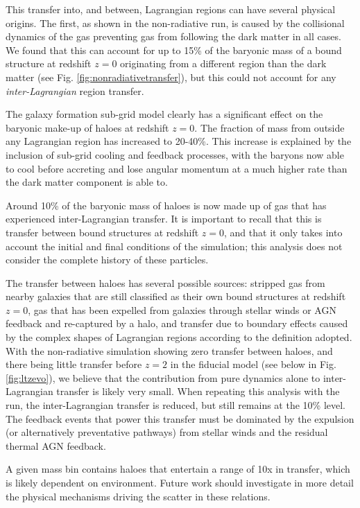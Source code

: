 This transfer into, and between, Lagrangian regions can have several physical
origins. The first, as shown in the non-radiative run, is caused by the
collisional dynamics of the gas preventing gas from following the dark matter
in all cases. We found that this can account for up to 15\% of the baryonic
mass of a bound structure at redshift $z=0$ originating from a different
region than the dark matter (see Fig. \ref{fig:nonradiativetransfer}), but this
could not account for any \emph{inter-Lagrangian} region transfer.

The galaxy formation sub-grid model clearly has a significant effect on the
baryonic make-up of haloes at redshift $z=0$. The fraction of mass from
outside any Lagrangian region has increased to 20-40\%. This increase is
explained by the inclusion of sub-grid cooling and feedback processes, with
the baryons now able to cool before accreting and lose angular momentum at a
much higher rate than the dark matter component is able to.

Around 10\% of the baryonic mass of haloes is now made up of gas that has
experienced inter-Lagrangian transfer. It is important to recall that this is transfer
between bound structures at redshift $z=0$, and that it only takes into account
the initial and final conditions of the simulation; this analysis does not
consider the complete history of these particles.

The transfer between haloes has several possible sources: stripped gas from
nearby galaxies that are still classified as their own bound structures at
redshift $z=0$, gas that has been expelled from galaxies through stellar
winds or AGN feedback and re-captured by a halo, and transfer due to boundary
effects caused by the complex shapes of Lagrangian regions according to the
definition adopted. With the non-radiative simulation showing zero transfer
between haloes, and there being little transfer before $z=2$ in the fiducial
model (see below in Fig. \ref{fig:ltzevo}), we believe that the contribution
from pure dynamics alone to inter-Lagrangian transfer is likely very small.
When repeating this analysis with the \nojet{} run, the inter-Lagrangian
transfer is reduced, but still remains at the 10\% level. The feedback events
that power this transfer must be dominated by the expulsion (or alternatively
preventative pathways) from stellar winds and the residual thermal AGN
feedback.

A given mass bin contains haloes that entertain a range of 10x in transfer,
which is likely dependent on environment. Future work should investigate in more detail
the physical mechanisms driving the scatter in these relations.

